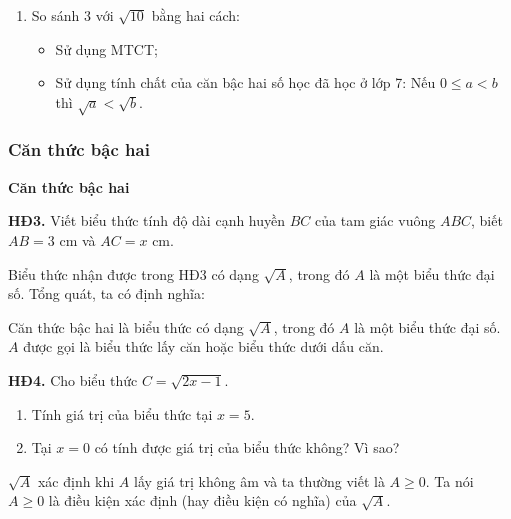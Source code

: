 \begin{lesson}
\begin{enumerate}[label=\alph*)]
        \answerline
        \item So sánh $3$ với $\sqrt{10}$ bằng hai cách:
        \begin{itemize}
            \item Sử dụng MTCT;
            \item Sử dụng tính chất của căn bậc hai số học đã học ở lớp 7: Nếu $0\le a<b$ thì $\sqrt{a}<\sqrt{b}$.
        \end{itemize}

        \answerline
    \end{enumerate}

    \subsubsection{Căn thức bậc hai}

    \textbf{Căn thức bậc hai}

    \textbf{HĐ3.} Viết biểu thức tính độ dài cạnh huyền $BC$ của tam giác vuông $ABC$, biết $AB=3$ cm và $AC=x$ cm.

    \answerline

    Biểu thức nhận được trong HĐ3 có dạng $\sqrt{A}$, trong đó $A$ là một biểu thức đại số. Tổng quát, ta có định nghĩa:

    \begin{keyconcept}
        Căn thức bậc hai là biểu thức có dạng $\sqrt{A}$, trong đó $A$ là một biểu thức đại số. $A$ được gọi là biểu thức lấy căn hoặc biểu thức dưới dấu căn.
    \end{keyconcept}

    \textbf{HĐ4.} Cho biểu thức $C=\sqrt{2x-1}$.
    \begin{enumerate}[label=\alph*)]
        \item Tính giá trị của biểu thức tại $x=5$.
        \item Tại $x=0$ có tính được giá trị của biểu thức không? Vì sao?
    \end{enumerate}

    \answerline
    \answerline

    \begin{keyconcept}
        $\sqrt{A}$ xác định khi $A$ lấy giá trị không âm và ta thường viết là $A\ge0$. Ta nói $A\ge0$ là điều kiện xác định (hay điều kiện có nghĩa) của $\sqrt{A}$.
    \end{keyconcept}


\end{lesson}
